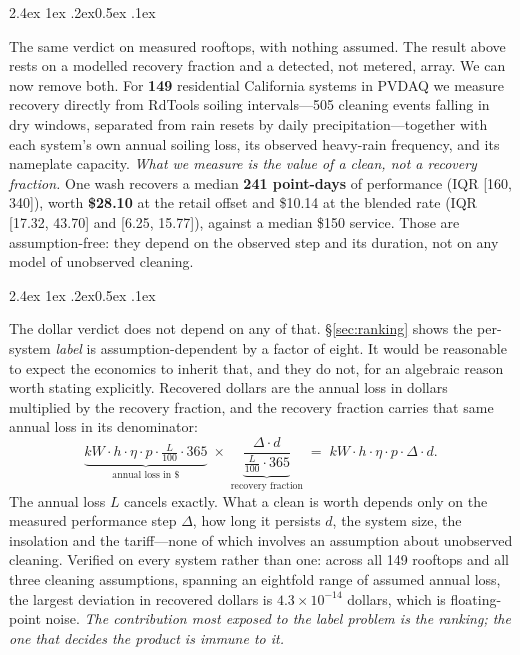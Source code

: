 \documentclass[10pt,twocolumn]{article}
\makeatletter
\renewcommand\paragraph{\@startsection{paragraph}{4}{\z@}%
  {2.4ex \@plus1ex \@minus.2ex}{0.5ex \@plus .1ex}%
  {\normalfont\normalsize\bfseries\raggedright}}
\makeatother
\begin{document}
\paragraph{The same verdict on measured rooftops, with nothing assumed.}
The result above rests on a modelled recovery fraction and a detected, not metered,
array. We can now remove both. For \textbf{149} residential California systems in PVDAQ
we measure recovery directly from RdTools soiling intervals---505 cleaning events falling
in dry windows, separated from rain resets by daily precipitation---together with each
system's own annual soiling loss, its observed heavy-rain frequency, and its nameplate
capacity. \emph{What we measure is the value of a clean, not a recovery fraction.} One
wash recovers a median \textbf{241 point-days} of performance (IQR [160, 340]), worth
\textbf{\$28.10} at the retail offset and \$10.14 at the blended rate (IQR [17.32, 43.70]
and [6.25, 15.77]), against a median \$150 service. Those are assumption-free: they depend
on the observed step and its duration, not on any model of unobserved cleaning.

\paragraph{The dollar verdict does not depend on any of that.}
\S\ref{sec:ranking} shows the per-system \emph{label} is assumption-dependent by a factor
of eight. It would be reasonable to expect the economics to inherit that, and they do not,
for an algebraic reason worth stating explicitly. Recovered dollars are the annual loss in
dollars multiplied by the recovery fraction, and the recovery fraction carries that same
annual loss in its denominator:
\begin{equation*}
\underbrace{kW \cdot h \cdot \eta \cdot p \cdot \tfrac{L}{100} \cdot 365}_{\text{annual loss in \$}}
\;\times\;
\underbrace{\frac{\Delta \cdot d}{\tfrac{L}{100} \cdot 365}}_{\text{recovery fraction}}
\;=\; kW \cdot h \cdot \eta \cdot p \cdot \Delta \cdot d .
\end{equation*}
The annual loss $L$ cancels exactly. What a clean is worth depends only on the measured
performance step $\Delta$, how long it persists $d$, the system size, the insolation and
the tariff---none of which involves an assumption about unobserved cleaning. Verified on
every system rather than one: across all 149 rooftops and all three cleaning assumptions,
spanning an eightfold range of assumed annual loss, the largest deviation in recovered
dollars is $4.3\times10^{-14}$ dollars, which is floating-point noise. \emph{The contribution most exposed to the label problem is the
ranking; the one that decides the product is immune to it.}
\end{document}
